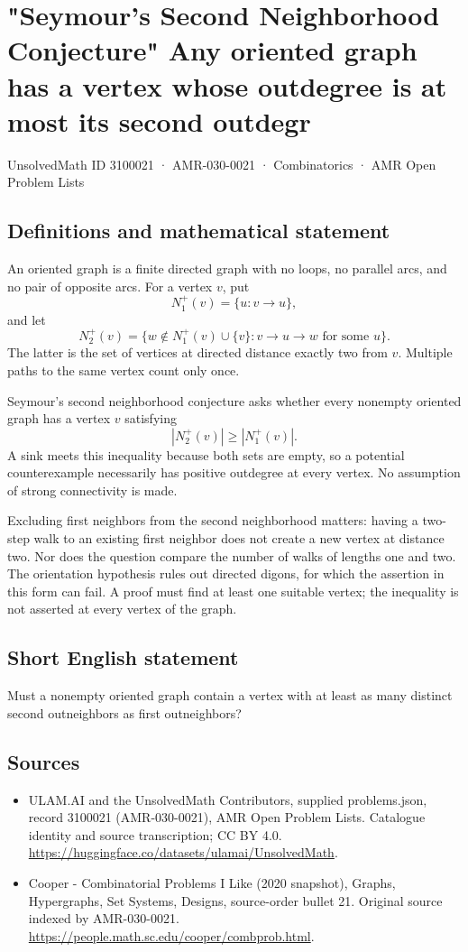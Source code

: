 \documentclass[11pt,a4paper]{article}
\begin{document}
\section*{"Seymour's Second Neighborhood Conjecture" Any oriented graph has a vertex whose outdegree is at most its second outdegr}\label{3100021}
{\small UnsolvedMath ID 3100021 · AMR-030-0021 · Combinatorics · AMR Open Problem Lists}
\subsection{Definitions and mathematical statement}
An oriented graph is a finite directed graph with no loops, no
parallel arcs, and no pair of opposite arcs. For a vertex $v$, put
\[
 N_1^+(v)=\{u:v\to u\},
\]
and let
\[
 N_2^+(v)=\{w\notin N_1^+(v)\cup\{v\}:
                     v\to u\to w\text{ for some }u\}.
\]
The latter is the set of vertices at directed distance exactly
two from $v$. Multiple paths to the same vertex count only once.

Seymour's second neighborhood conjecture asks whether every
nonempty oriented graph has a vertex $v$ satisfying
\[
                         |N_2^+(v)|\ge |N_1^+(v)|.
\]
A sink meets this inequality because both sets are empty, so a
potential counterexample necessarily has positive outdegree at
every vertex. No assumption of strong connectivity is made.

Excluding first neighbors from the second neighborhood matters:
having a two-step walk to an existing first neighbor does not
create a new vertex at distance two. Nor does the question compare
the number of walks of lengths one and two. The orientation
hypothesis rules out directed digons, for which the assertion in
this form can fail. A proof must find at least one suitable vertex;
the inequality is not asserted at every vertex of the graph.
\subsection{Short English statement}
Must a nonempty oriented graph contain a vertex with at least as many distinct second outneighbors as first outneighbors?
\subsection{Sources}
\begin{itemize}
\item[S1] ULAM.AI and the UnsolvedMath Contributors, supplied problems.json, record 3100021 (AMR-030-0021), AMR Open Problem Lists. Catalogue identity and source transcription; CC BY 4.0.
\url{https://huggingface.co/datasets/ulamai/UnsolvedMath}.
\item[S2] Cooper - Combinatorial Problems I Like (2020 snapshot), Graphs, Hypergraphs, Set Systems, Designs, source-order bullet 21. Original source indexed by AMR-030-0021.
\url{https://people.math.sc.edu/cooper/combprob.html}.
\end{itemize}
\end{document}
